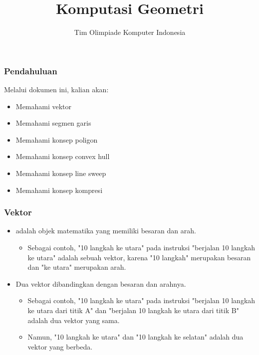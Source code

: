 

\title{Komputasi Geometri}
\author{Tim Olimpiade Komputer Indonesia}
\date{}



\begin{frame}
\titlepage
\end{frame}

\begin{frame}
\frametitle{Pendahuluan}
Melalui dokumen ini, kalian akan:
\begin{itemize}
  \item Memahami vektor
  \item Memahami segmen garis
  \item Memahami konsep poligon
  \item Memahami konsep convex hull
  \item Memahami konsep line sweep
  \item Memahami konsep kompresi
\end{itemize}
\end{frame}

\begin{frame}
\frametitle{Vektor}
\begin{itemize}
  \item {} adalah objek matematika yang memiliki besaran dan arah.
  \begin{itemize}
    \item Sebagai contoh, "10 langkah ke utara" pada instruksi "berjalan 10 langkah ke utara" adalah sebuah vektor, karena "10 langkah" merupakan besaran dan "ke utara" merupakan arah. 
  \end{itemize}
  \item Dua vektor dibandingkan dengan besaran dan arahnya.
  \begin{itemize}
    \item Sebagai contoh, "10 langkah ke utara" pada instruksi "berjalan 10 langkah ke utara dari titik A" dan "berjalan 10 langkah ke utara dari titik B" adalah dua vektor yang sama.
    \item Namun, "10 langkah ke utara" dan "10 langkah ke selatan" adalah dua vektor yang berbeda.
  \end{itemize}
\end{itemize}
\end{frame}

